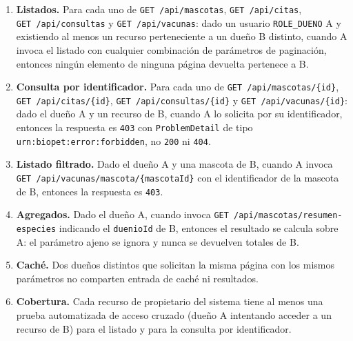 \documentclass[
  spanish,
]{article}
\providecommand{\tightlist}{%
  \setlength{\itemsep}{0pt}\setlength{\parskip}{0pt}}
\begin{document}
\begin{itemize}
  \begin{enumerate}
  \def\labelenumi{\arabic{enumi}.}
  \tightlist
  \item
    \textbf{Listados.} Para cada uno de \texttt{GET\ /\allowbreak{}api/\allowbreak{}mascotas},
    \texttt{GET\ /\allowbreak{}api/\allowbreak{}citas}, \texttt{GET\ /\allowbreak{}api/\allowbreak{}consultas} y
    \texttt{GET\ /\allowbreak{}api/\allowbreak{}vacunas}: dado un usuario \texttt{ROLE\_\allowbreak{}DUENO} A y
    existiendo al menos un recurso perteneciente a un dueño B distinto,
    cuando A invoca el listado con cualquier combinación de parámetros
    de paginación, entonces ningún elemento de ninguna página devuelta
    pertenece a B.
  \item
    \textbf{Consulta por identificador.} Para cada uno de
    \texttt{GET\ /\allowbreak{}api/\allowbreak{}mascotas/\allowbreak{}\{id\}}, \texttt{GET\ /\allowbreak{}api/\allowbreak{}citas/\allowbreak{}\{id\}},
    \texttt{GET\ /\allowbreak{}api/\allowbreak{}consultas/\allowbreak{}\{id\}} y
    \texttt{GET\ /\allowbreak{}api/\allowbreak{}vacunas/\allowbreak{}\{id\}}: dado el dueño A y un recurso de
    B, cuando A lo solicita por su identificador, entonces la respuesta
    es \texttt{403} con \texttt{Problem\allowbreak{}Detail} de tipo
    \texttt{urn:biopet:error:\allowbreak{}forbidden}, no \texttt{200} ni
    \texttt{404}.
  \item
    \textbf{Listado filtrado.} Dado el dueño A y una mascota de B,
    cuando A invoca \texttt{GET\ /\allowbreak{}api/\allowbreak{}vacunas/\allowbreak{}mascota/\allowbreak{}\{mascota\allowbreak{}Id\}} con
    el identificador de la mascota de B, entonces la respuesta es
    \texttt{403}.
  \item
    \textbf{Agregados.} Dado el dueño A, cuando invoca
    \texttt{GET\ /\allowbreak{}api/\allowbreak{}mascotas/\allowbreak{}resumen-\allowbreak{}especies} indicando el
    \texttt{duenio\allowbreak{}Id} de B, entonces el resultado se calcula sobre A: el
    parámetro ajeno se ignora y nunca se devuelven totales de B.
  \item
    \textbf{Caché.} Dos dueños distintos que solicitan la misma página
    con los mismos parámetros no comparten entrada de caché ni
    resultados.
  \item
    \textbf{Cobertura.} Cada recurso de propietario del sistema tiene al
    menos una prueba automatizada de acceso cruzado (dueño A intentando
    acceder a un recurso de B) para el listado y para la consulta por
    identificador.
  \end{enumerate}

\end{itemize}
\end{document}
